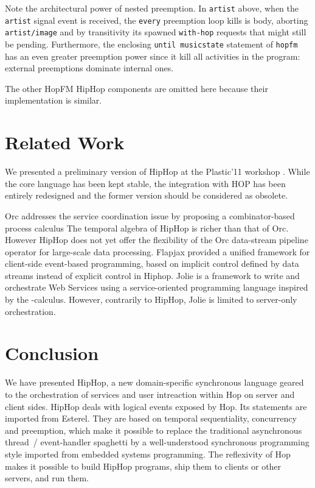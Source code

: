 \documentclass{llncs}
\begin{document}
\noindent 
Note the architectural power of nested preemption.  In
\texttt{artist{}} above, when the {\texttt{artist}} signal
event is received, the \texttt{every{}} preemption loop kills
is body, aborting \texttt{artist/image{}} and by transitivity
its spawned {\texttt{with-hop{}}} requests that might still be
pending. Furthermore, the enclosing
\texttt{until{}\ musicstate} statement of
\texttt{hopfm{}} has an even greater preemption power since it kill
all activities in the program: external preemptions dominate internal ones.

The other HopFM HipHop components are omitted here because their
implementation is similar.

\section{Related Work}
\label{Related works}

We presented a  preliminary version of HipHop at the Plastic'11 workshop
\cite{bns:plastic11}. While the core language has been kept stable, the
integration with HOP has been entirely redesigned and the former
version should be considered as obsolete. 

Orc \cite{KitchinCookMisra2006a} addresses the service coordination
issue by proposing a combinator-based process calculus The temporal
algebra of HipHop is richer than that of Orc. However HipHop does not
yet offer the flexibility of the Orc data-stream pipeline 
operator for large-scale data processing.  Flapjax
\cite{Meyerovich:2009:FPL} provided a unified framework for
client-side event-based programming, based on implicit control defined
by data streams instead of explicit control in Hiphop.  Jolie
\cite{DBLP:journals/entcs/MontesiGLZ07} is a framework to write and
orchestrate Web Services using a service-oriented programming language
inspired by the -calculus. However, contrarily to HipHop, Jolie is limited to
server-only orchestration.



\section{Conclusion}
\label{Conclusion}

We have presented HipHop, a new domain-specific synchronous language  
geared to the orchestration of services and user intreaction
within Hop on server and client sides. HipHop deals with logical
events exposed by Hop. Its statements are imported from
Esterel. They are based on temporal sequentiality, concurrency and
preemption, which make it possible to replace the
traditional asynchronous thread~/ event-handler spaghetti \cite{Lee2006} 
by a well-understood 
synchronous programming style imported from embedded systems
programming. The reflexivity of Hop makes it possible to build HipHop programs,
ship them to clients or other servers, and run them. 
\end{document}
